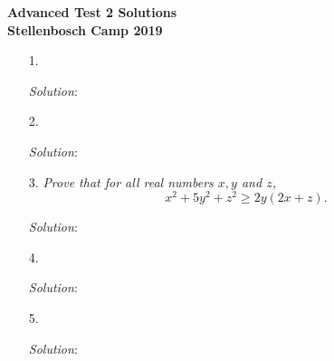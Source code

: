 \documentclass{article}
\begin{document}
\begin{center}
  \textbf{\Large Advanced Test 2 Solutions}
  \\ \vspace{1em}
  \textbf{\large Stellenbosch Camp 2019}
\end{center}


\begin{enumerate}[1.]

\item[1.] %
\textit{}

\textit{Solution}:



\item[2.] %
\textit{}

\textit{Solution}:


\item[3.] %
\textit{Prove that for all real numbers $x, y$ and $z$,
$$ x^2 + 5y^2 + z^2 \ge 2y(2x + z). $$}

\textit{Solution}:


\item[4.] %
\textit{}

\textit{Solution}:


\item[5.] %
\textit{}

\textit{Solution}: 


\end{enumerate}
\end{document}
